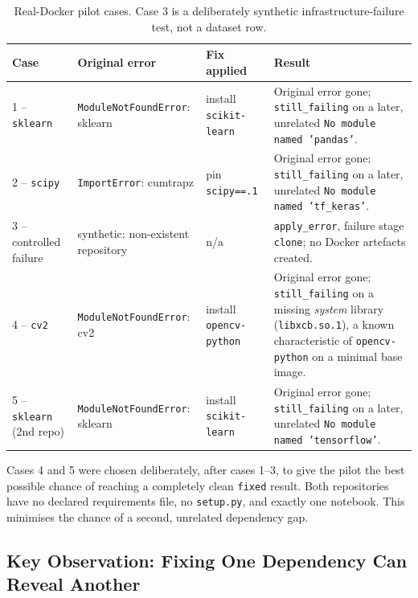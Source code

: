 \begin{table}[htbp]
  \centering
  \small
  \setlength{\tabcolsep}{3pt}
  \begin{tabular}{|p{1.7cm}|p{3.2cm}|p{2.6cm}|p{5.7cm}|}
    \hline
    \textbf{Case} & \textbf{Original error} & \textbf{Fix applied} & \textbf{Result} \\
    \hline
    1 -- \texttt{sklearn} & \texttt{ModuleNot\-FoundError}: sklearn & install \texttt{scikit-learn} &
      Original error gone; \texttt{still\_failing} on a later, unrelated \texttt{No module named 'pandas'}. \\
    \hline
    2 -- \texttt{scipy} & \texttt{ImportError}: cumtrapz & pin \texttt{scipy==\allowbreak 1.13.1} &
      Original error gone; \texttt{still\_failing} on a later, unrelated \texttt{No module named 'tf\_keras'}. \\
    \hline
    3 -- controlled failure & synthetic: non-existent repository & n/a &
      \texttt{apply\_error}, failure stage \texttt{clone}; no Docker artefacts created. \\
    \hline
    4 -- \texttt{cv2} & \texttt{ModuleNot\-FoundError}: cv2 & install \texttt{opencv-\allowbreak python} &
      Original error gone; \texttt{still\_failing} on a missing \emph{system} library (\texttt{libxcb.so.1}), a known characteristic of \texttt{opencv-python} on a minimal base image. \\
    \hline
    5 -- \texttt{sklearn} (2nd repo) & \texttt{ModuleNot\-FoundError}: sklearn & install \texttt{scikit-learn} &
      Original error gone; \texttt{still\_failing} on a later, unrelated \texttt{No module named 'tensorflow'}. \\
    \hline
  \end{tabular}
  \caption[Real-Docker pilot cases]{Real-Docker pilot cases. Case 3 is a deliberately synthetic
  infrastructure-failure test, not a dataset row.}
  \label{tab:v-i5-cases}
\end{table}

Cases 4 and 5 were chosen deliberately, after cases 1--3, to give the
pilot the best possible chance of reaching a completely clean
\texttt{fixed} result. Both repositories have no declared requirements
file, no \texttt{setup.py}, and exactly one notebook. This minimises the
chance of a second, unrelated dependency gap.

\subsection{Key Observation: Fixing One Dependency Can Reveal Another}
\label{sec:v-key-observation}

